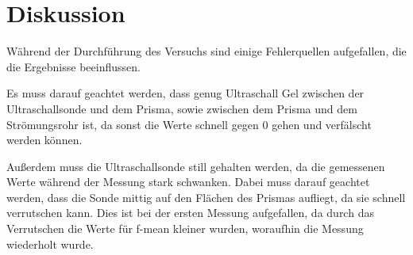 \section{Diskussion}
\label{sec:Diskussion}
Während der Durchführung des Versuchs sind einige Fehlerquellen aufgefallen, die die Ergebnisse beeinflussen.

\noindent
Es muss darauf geachtet werden, dass genug Ultraschall Gel zwischen der Ultraschallsonde und dem Prisma, 
sowie zwischen dem Prisma und dem Strömungsrohr ist, da sonst die Werte schnell gegen 0 gehen und verfälscht werden können.

\noindent
Außerdem muss die Ultraschallsonde still gehalten werden, da die gemessenen Werte während der Messung stark schwanken.
Dabei muss darauf geachtet werden, dass die Sonde mittig auf den Flächen des Prismas aufliegt, da sie schnell verrutschen kann.
Dies ist bei der ersten Messung aufgefallen, da durch das Verrutschen die Werte für f-mean kleiner wurden, 
woraufhin die Messung wiederholt wurde.

\noindent
